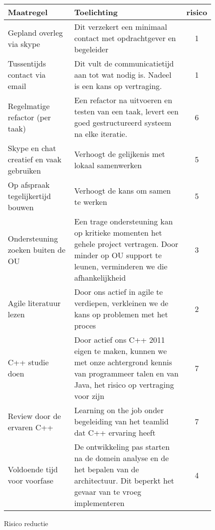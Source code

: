 \begin{figure}[!ht]
\begin{center}
\tiny
\begin{tabular}{|p{20em}p{30em}c|}
\hline
    {\bf Maatregel} & {\bf Toelichting} & {\bf risico} \\\hline
    Gepland overleg via skype & Dit verzekert een minimaal contact met opdrachtgever en begeleider & 1\\\hline
    Tussentijds contact via email & Dit vult de communicatietijd aan tot wat nodig is. Nadeel is
				    een kans op vertraging. & 1\\\hline
    Regelmatige refactor (per taak) & Een refactor na uitvoeren en testen van een taak, levert
					een goed gestructureerd systeem na elke iteratie. & 6\\\hline
    Skype en chat creatief en vaak gebruiken & Verhoogt de gelijkenis met lokaal samenwerken & 5\\\hline
    Op afspraak tegelijkertijd bouwen & Verhoogt de kans om samen te werken & 5\\\hline
    Ondersteuning zoeken buiten de OU & Een trage ondersteuning kan op kritieke momenten
					het gehele project vertragen. Door minder op
					OU support te leunen, verminderen we die afhankelijkheid & 3\\\hline
    Agile literatuur lezen & Door ons actief in agile te verdiepen, verkleinen we de kans op
				problemen met het proces & 2\\\hline
    C++ studie doen & Door actief ons C++ 2011 eigen te maken, kunnen we
			met onze achtergrond kennis van programmeer talen en
			van Java, het risico op vertraging voor zijn & 7\\\hline
    Review door de ervaren C++ & Learning on the job onder begeleiding van
				het teamlid dat C++ ervaring heeft & 7\\\hline
    Voldoende tijd voor voorfase & De ontwikkeling pas starten na de domein
				analyse en de het bepalen van de architectuur.
				Dit beperkt het gevaar van te vroeg implementeren & 4\\\hline
\end{tabular}
\end{center}
 \caption{Risico reductie}\label{fig: risico reductie}
\end{figure}